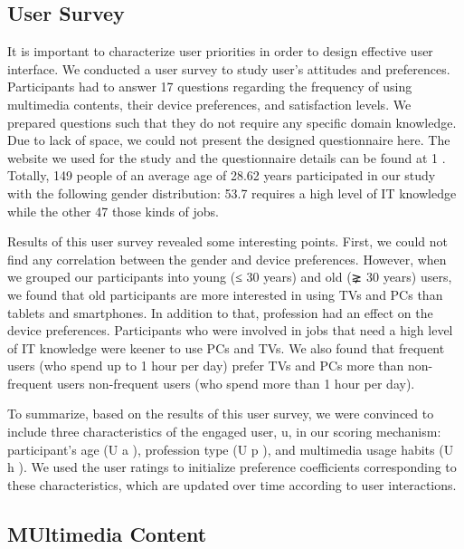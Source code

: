 \documentclass[runningheads,a4paper]{llncs}
\begin{document}
\subsection{User Survey}

It is important to characterize user priorities in order to design effective user
interface. We conducted a user survey to study user’s attitudes and preferences.
Participants had to answer 17 questions regarding the frequency of using multimedia contents, their device preferences, and satisfaction levels. We prepared
questions such that they do not require any specific domain knowledge. Due to
lack of space, we could not present the designed questionnaire here. The website
we used for the study and the questionnaire details can be found at 1
. Totally, 149 people of an average age of 28.62 years participated in our study with the
following gender distribution: 53.7%
requires a high level of IT knowledge while the other 47%
those kinds of jobs.



Results of this user survey revealed some interesting points. First, we could
not find any correlation between the gender and device preferences. However,
when we grouped our participants into young (≤ 30 years) and old (⪈ 30 years)
users, we found that old participants are more interested in using TVs and PCs
than tablets and smartphones. In addition to that, profession had an effect on
the device preferences. Participants who were involved in jobs that need a high
level of IT knowledge were keener to use PCs and TVs. We also found that
frequent users (who spend up to 1 hour per day) prefer TVs and PCs more than
non-frequent users non-frequent users (who spend more than 1 hour per day).



To summarize, based on the results of this user survey, we were convinced to
include three characteristics of the engaged user, u, in our scoring mechanism:
participant’s age (U
a
), profession type (U
p
), and multimedia usage habits (U
h
).
We used the user ratings to initialize preference coefficients corresponding to
these characteristics, which are updated over time according to user interactions.



\subsection{MUltimedia Content}
\end{document}
